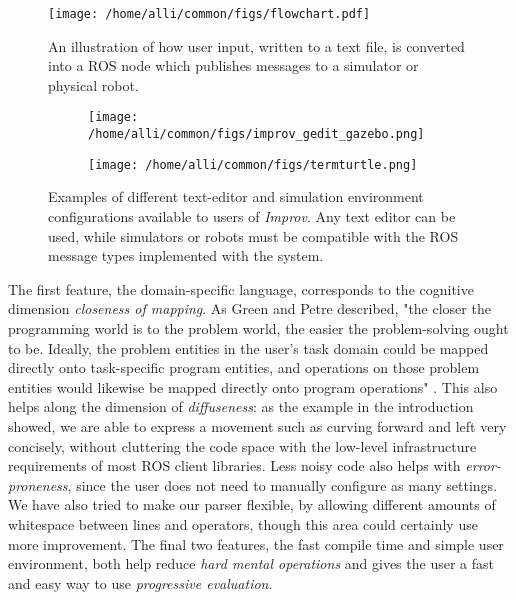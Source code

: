 \documentclass[sigconf]{acmart}
\begin{document}
\begin{figure}[h]
\centering
\texttt{[image: /home/alli/common/figs/flowchart.pdf]}
\caption{An illustration of how user input, written to a text file, is
converted into a ROS node which publishes messages to a simulator or physical 
robot.
\label{flowchart}}
\end{figure}


\begin{figure*}[h!]
    \begin{subfigure}{0.45\textwidth}
        \texttt{[image: /home/alli/common/figs/improv\_gedit\_gazebo.png]}
    \end{subfigure}\hfill%
    \begin{subfigure}{0.45\textwidth}
        \texttt{[image: /home/alli/common/figs/termturtle.png]}
    \end{subfigure}
    \caption{Examples of different text-editor and simulation environment
configurations available to users of \emph{Improv}. Any text editor can be
used, while simulators or robots must be compatible with the ROS message types
implemented with the system.}
\end{figure*}



The first feature, the domain-specific language, corresponds to the cognitive
dimension \emph{closeness of
mapping}. As Green and Petre described, "the closer the programming world is to
the problem world, the easier the problem-solving ought to be. Ideally, the
problem entities in the user's task domain could be mapped directly onto
task-specific program entities, and operations on those problem entities would
likewise be mapped directly onto program operations" \cite{green1996usability}.
This also helps along the dimension of \emph{diffuseness}: as the example in the
introduction showed, we are able to express a movement such as curving forward
and left very concisely, without cluttering the code space with the low-level
infrastructure requirements of most ROS client libraries. Less noisy code also
helps with \emph{error-proneness}, since the user does not need to manually
configure as many settings. We have also tried to make our parser flexible, by
allowing different amounts of whitespace between lines and operators, though
this area could certainly use more improvement. The final two features, the fast
compile time and simple user environment, both help reduce \emph{hard mental
operations} and gives the user a fast and easy way to use \emph{progressive
evaluation}.
\end{document}
